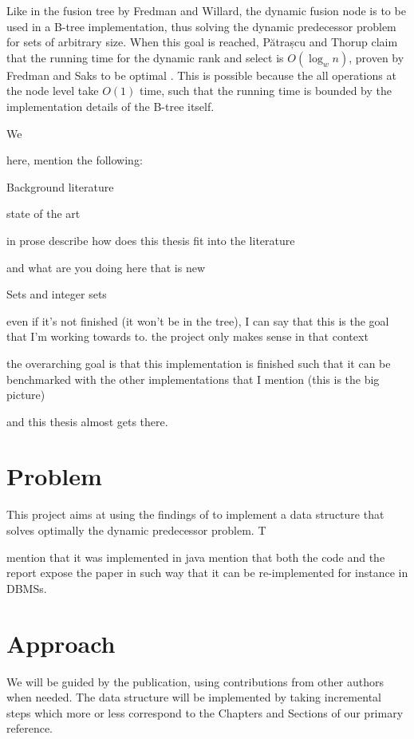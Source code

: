Like in the fusion tree by Fredman and Willard, the dynamic fusion node is to be used in a B-tree implementation, thus solving the dynamic predecessor problem for sets of arbitrary size. When this goal is reached, Pătrașcu and Thorup claim that the running time for the dynamic rank and select is $O(\log_w n)$, proven by Fredman and Saks to be optimal \cite{fredman1989cell}. This is possible because the all operations at the node level take $O(1)$ time, such that the running time is bounded by the implementation details of the B-tree itself.

We 

here, mention the following:

Background literature

state of the art

in prose describe how does this thesis fit into the literature

and what are you doing here that is new

Sets and integer sets

even if it's not finished (it won't be in the tree), I can say that this is the goal that I'm working towards to. the project only makes sense in that context
    
the overarching goal is that this implementation is finished such that it can be benchmarked with the other implementations that I mention (this is the big picture)
    
and this thesis almost gets there.

\section{Problem}

This project aims at using the findings of \cite{patrascu2014dynamic} to implement a data structure that solves optimally the dynamic predecessor problem. T

mention that it was implemented in java
mention that both the code and the report expose the paper in such way that it can be re-implemented for instance in DBMSs.

\section{Approach} %

We will be guided by the \cite{patrascu2014dynamic} publication, using contributions from other authors when needed. The data structure will be implemented by taking incremental steps which more or less correspond to the Chapters and Sections of our primary reference.

